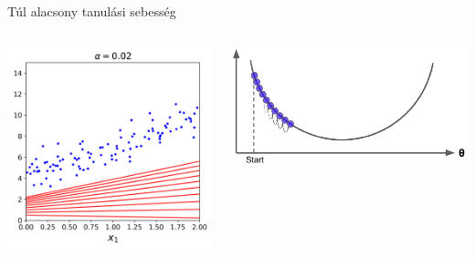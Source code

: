 \documentclass[english, aspectratio=169]{beamer}
\begin{document}
\begin{frame}{Túl alacsony tanulási sebesség}
\begin{columns}
\begin{column}{.5\textwidth}
\begin{center}
\includegraphics[width=6cm, keepaspectratio]{images/ql_17.png}
\end{center}
\end{column}
\begin{column}{.5\textwidth}
\begin{center}
\includegraphics[width=7cm, keepaspectratio]{images/ql_14.png}
\end{center}
\end{column}
\end{columns}
\end{frame}
\end{document}
